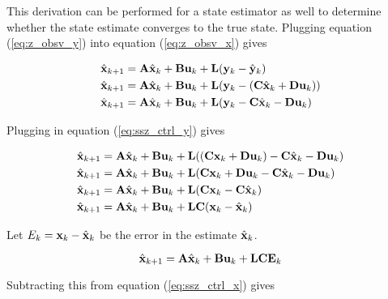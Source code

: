 This derivation can be performed for a \gls{state} estimator as well to
determine whether the \gls{state} estimate converges to the true \gls{state}.
Plugging equation (\ref{eq:z_obsv_y}) into equation (\ref{eq:z_obsv_x}) gives

\begin{align*}
  \hat{\mathbf{x}}_{k+1} &= \mathbf{A}\hat{\mathbf{x}}_k + \mathbf{B}\mathbf{u}_k +
    \mathbf{L} (\mathbf{y}_k - \hat{\mathbf{y}}_k) \\
  \hat{\mathbf{x}}_{k+1} &= \mathbf{A}\hat{\mathbf{x}}_k + \mathbf{B}\mathbf{u}_k +
    \mathbf{L} (\mathbf{y}_k - (\mathbf{C}\hat{\mathbf{x}}_k + \mathbf{D}\mathbf{u}_k)) \\
  \hat{\mathbf{x}}_{k+1} &= \mathbf{A}\hat{\mathbf{x}}_k + \mathbf{B}\mathbf{u}_k +
    \mathbf{L} (\mathbf{y}_k - \mathbf{C}\hat{\mathbf{x}}_k - \mathbf{D}\mathbf{u}_k)
\end{align*}

Plugging in equation (\ref{eq:ssz_ctrl_y}) gives

\begin{align*}
  \hat{\mathbf{x}}_{k+1} &= \mathbf{A}\hat{\mathbf{x}}_k + \mathbf{B}\mathbf{u}_k +
    \mathbf{L}((\mathbf{C}\mathbf{x}_k + \mathbf{D}\mathbf{u}_k) - \mathbf{C}\hat{\mathbf{x}}_k -
    \mathbf{D}\mathbf{u}_k) \\
  \hat{\mathbf{x}}_{k+1} &= \mathbf{A}\hat{\mathbf{x}}_k + \mathbf{B}\mathbf{u}_k +
    \mathbf{L}(\mathbf{C}\mathbf{x}_k + \mathbf{D}\mathbf{u}_k - \mathbf{C}\hat{\mathbf{x}}_k -
    \mathbf{D}\mathbf{u}_k) \\
  \hat{\mathbf{x}}_{k+1} &= \mathbf{A}\hat{\mathbf{x}}_k + \mathbf{B}\mathbf{u}_k +
    \mathbf{L}(\mathbf{C}\mathbf{x}_k - \mathbf{C}\hat{\mathbf{x}}_k) \\
  \hat{\mathbf{x}}_{k+1} &= \mathbf{A}\hat{\mathbf{x}}_k + \mathbf{B}\mathbf{u}_k +
    \mathbf{L}\mathbf{C}(\mathbf{x}_k - \hat{\mathbf{x}}_k)
\end{align*}

Let $E_k = \mathbf{x}_k - \hat{\mathbf{x}}_k$ be the error in the estimate
$\hat{\mathbf{x}}_k$.

\begin{equation*}
  \hat{\mathbf{x}}_{k+1} = \mathbf{A}\hat{\mathbf{x}}_k + \mathbf{B}\mathbf{u}_k +
    \mathbf{L}\mathbf{C}\mathbf{E}_k
\end{equation*}

Subtracting this from equation (\ref{eq:ssz_ctrl_x}) gives


